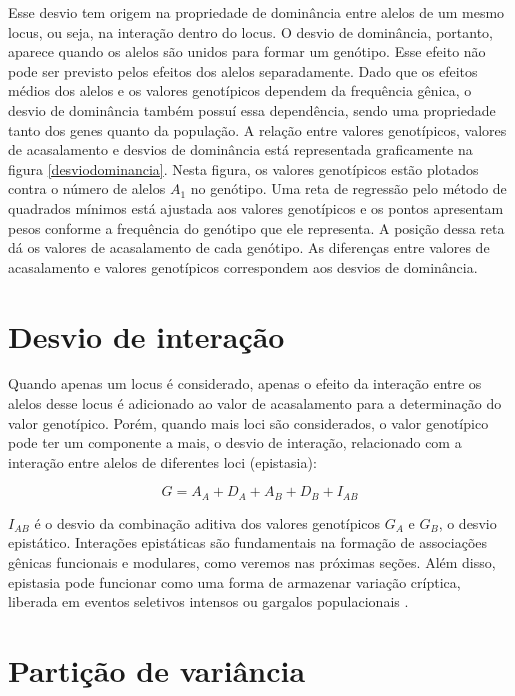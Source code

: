 \documentclass[portuges,]{tufte-handout}
\begin{document}
Esse desvio tem origem na propriedade de dominância entre alelos de um
mesmo locus, ou seja, na interação dentro do locus. O desvio de
dominância, portanto, aparece quando os alelos são unidos para formar um
genótipo. Esse efeito não pode ser previsto pelos efeitos dos alelos
separadamente. Dado que os efeitos médios dos alelos e os valores
genotípicos dependem da frequência gênica, o desvio de dominância também
possuí essa dependência, sendo uma propriedade tanto dos genes quanto da
população. A relação entre valores genotípicos, valores de acasalamento
e desvios de dominância está representada graficamente na figura
\ref{desviodominancia}. Nesta figura, os valores genotípicos estão
plotados contra o número de alelos $A_1$ no genótipo. Uma reta de
regressão pelo método de quadrados mínimos está ajustada aos valores
genotípicos e os pontos apresentam pesos conforme a frequência do
genótipo que ele representa. A posição dessa reta dá os valores de
acasalamento de cada genótipo. As diferenças entre valores de
acasalamento e valores genotípicos correspondem aos desvios de
dominância.

\section{Desvio de interação}\label{desvio-de-interauxe7uxe3o}

Quando apenas um locus é considerado, apenas o efeito da interação entre
os alelos desse locus é adicionado ao valor de acasalamento para a
determinação do valor genotípico. Porém, quando mais loci são
considerados, o valor genotípico pode ter um componente a mais, o desvio
de interação, relacionado com a interação entre alelos de diferentes
loci (epistasia):

\[
G = A_A + D_A + A_B + D_B + I_{AB}
\]

$I_{AB}$ é o desvio da combinação aditiva dos valores genotípicos $G_A$
e $G_B$, o desvio epistático. Interações epistáticas são fundamentais na
formação de associações gênicas funcionais e modulares, como veremos nas
próximas seções. Além disso, epistasia pode funcionar como uma forma de
armazenar variação críptica, liberada em eventos seletivos intensos ou
gargalos populacionais \cite{Cheverud1996a}.

\section{Partição de variância}\label{partiuxe7uxe3o-de-variuxe2ncia}
\end{document}
